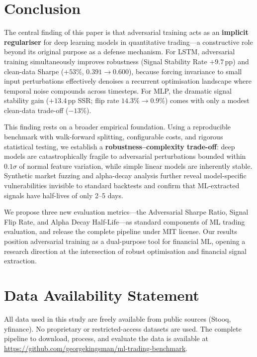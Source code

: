 \documentclass[preprint,review,12pt]{elsarticle}
\begin{document}
\section{Conclusion}

The central finding of this paper is that adversarial training acts as an \textbf{implicit regulariser} for deep learning models in quantitative trading---a constructive role beyond its original purpose as a defense mechanism.
For LSTM, adversarial training simultaneously improves robustness (Signal Stability Rate $+9.7$\,pp) and clean-data Sharpe ($+53\%$, $0.391 \to 0.600$), because forcing invariance to small input perturbations effectively denoises a recurrent optimisation landscape where temporal noise compounds across timesteps.
For MLP, the dramatic signal stability gain ($+13.4$\,pp SSR; flip rate $14.3\% \to 0.9\%$) comes with only a modest clean-data trade-off ($-13\%$).

This finding rests on a broader empirical foundation.
Using a reproducible benchmark with walk-forward splitting, configurable costs, and rigorous statistical testing, we establish a \textbf{robustness--complexity trade-off}: deep models are catastrophically fragile to adversarial perturbations bounded within $0.1\sigma$ of normal feature variation, while simple linear models are inherently stable.
Synthetic market fuzzing and alpha-decay analysis further reveal model-specific vulnerabilities invisible to standard backtests and confirm that ML-extracted signals have half-lives of only 2--5 days.

We propose three new evaluation metrics---the Adversarial Sharpe Ratio, Signal Flip Rate, and Alpha Decay Half-Life---as standard components of ML trading evaluation, and release the complete pipeline under MIT license.
Our results position adversarial training as a dual-purpose tool for financial ML, opening a research direction at the intersection of robust optimisation and financial signal extraction.


\section*{Data Availability Statement}

All data used in this study are freely available from public sources (Stooq, yfinance).
No proprietary or restricted-access datasets are used.
The complete pipeline to download, process, and evaluate the data is available at
\url{https://github.com/georgekingsman/ml-trading-benchmark}.
\end{document}
